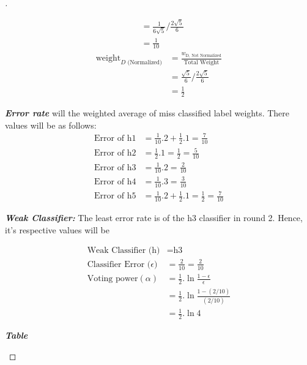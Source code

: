 \documentclass[a4paper, 12pt]{article}
\begin{document}
\begin{proof}[]
\begin{enumerate}[label={\color{blue}{\textbf{3.\arabic*})}}]
\begin{align*}
                    &= \frac{1}{6\sqrt{5}} / \frac{2\sqrt{5}}{6}\\
                    &= \frac{1}{10}
        \end{align*}
        \begin{align*}
            \text{weight}_{D \text{ (Normalized)}}  &= \frac{w_{\text{D, Not Normalized}}}{\text{Total Weight}} \\
                    &= \frac{\sqrt{5}}{6} / \frac{2\sqrt{5}}{6}\\
                    &= \frac{1}{2}
        \end{align*}
        
        \textit{\textbf{Error rate}} will the weighted average of miss classified label weights. There values will be as follows:
        \begin{align*}
            \text{Error of h1} &= \frac{1}{10}.2 + \frac{1}{2}.1 = \frac{7}{10}\\
            \text{Error of h2} &= \frac{1}{2}.1 = \frac{1}{2} = \frac{5}{10}\\
            \text{Error of h3} &= \frac{1}{10}.2 = \frac{2}{10}\\
            \text{Error of h4} &= \frac{1}{10}.3 = \frac{3}{10}\\
            \text{Error of h5} &= \frac{1}{10}.2 + \frac{1}{2}.1 = \frac{1}{2} = \frac{7}{10}
        \end{align*}
        
        \textit{\textbf{Weak Classifier:}} The least error rate is of the h3 classifier in round 2. Hence, it's respective values will be 
        
        \begin{align*}
            \text{Weak Classifier (h)} &= \text{h3}\\
            \text{Classifier Error ($\epsilon $)} &=  \frac{2}{10} = \frac{2}{10}  \\
            \text{Voting power} (\alpha)  &= \frac{1}{2}.\ln{\frac{1 - \epsilon}{\epsilon}} \\  
                    &= \frac{1}{2}.\ln{\frac{1 - (2/10)}{(2/10)}} \\ 
                    &= \frac{1}{2}.\ln{4}  
        \end{align*}
        
        \textit{\textbf{Table}}
        

\end{enumerate}
\end{proof}
\end{document}

